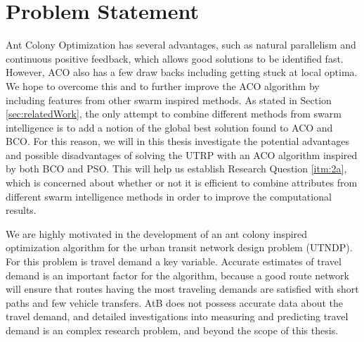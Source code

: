 \section{Problem Statement}

Ant Colony Optimization has several advantages, such as natural parallelism and continuous positive feedback, which allows good solutions to be identified fast. However, ACO also has a few draw backs including getting stuck at local optima. We hope to overcome this and to further improve the ACO algorithm by including features from other swarm inspired methods. As stated in Section \vref{sec:relatedWork}, the only attempt to combine different methods from swarm intelligence is to add a notion of the global best solution found to ACO and BCO. For this reason, we will in this thesis investigate the potential advantages and possible disadvantages of solving the UTRP with an ACO algorithm inspired by both BCO and PSO. This will help us establish Research Question \vref{itm:2a}, which is concerned about whether or not it is efficient to combine attributes from different swarm intelligence methods in order to improve the computational results.

We are highly motivated in the development of an ant colony inspired optimization algorithm for the urban transit network design problem (UTNDP). For this problem is travel demand a key variable. Accurate estimates of travel demand is an important factor for the algorithm, because a good route network will ensure that routes having the most traveling demands are satisfied with short paths and few vehicle transfers. AtB does not possess accurate data about the travel demand, and detailed investigations into measuring and predicting travel demand is an complex research problem, and beyond the scope of this thesis. 

